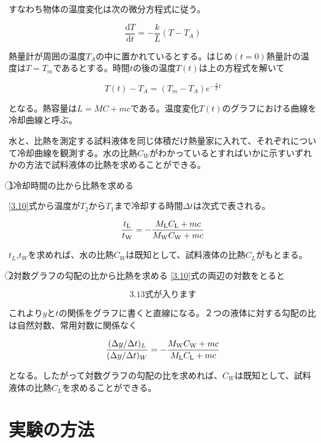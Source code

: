 \documentclass{jsarticle}
\begin{document}
すなわち物体の温度変化は次の微分方程式に従う。

\begin{equation}
	\frac{\textrm{d}T}{\textrm{d}t} = -\frac{k}{L}(T-T_A)
\end{equation}

熱量計が周囲の温度$T_A$の中に置かれているとする。はじめ$(t=0)$熱量計の温度は$T=T_m$であるとする。時間$t$の後の温度$T(t)$は上の方程式を解いて

\begin{equation}
\label{3.10}
	T(t)-T_A = (T_m-T_A)e^{-\frac{k}{L}t}
\end{equation}

となる。熱容量は$L = MC + mc$である。温度変化$T(t)$のグラフにおける曲線を冷却曲線と呼ぶ。\\
\par 水と、比熱を測定する試料液体を同じ体積だけ熱量家に入れて、それぞれについて冷却曲線を観測する。水の比熱$C_W$がわかっているとすればいかに示すいずれかの方法で試料液体の比熱を求めることができる。

\textcircled{\scriptsize 1}冷却時間の比から比熱を求める

\ref{3.10}式から温度が$T_2$から$T_1$まで冷却する時間$\Delta t$は次式で表される。

\begin{equation}
	\frac{t_\textrm L}{t_\textrm W} = -\frac{M_\textrm{L}C_\textrm L + mc}{M_\textrm W C_\textrm W +mc}
\end{equation}

$t_L$,$t_W$を求めれば、水の比熱$C_W$は既知として、試料液体の比熱$C_L$がもとまる。

\textcircled{\scriptsize 2}対数グラフの勾配の比から比熱を求める
\ref{3.10}式の両辺の対数をとると

\begin{equation}
	3.13式が入ります
\end{equation}

これより$y$と$t$の関係をグラフに書くと直線になる。２つの液体に対する勾配の比は自然対数、常用対数に関係なく

\begin{equation}
	\frac{(\Delta y/\Delta t)_L}{(\Delta y/\Delta t)_W} = -\frac{M_\textrm W C_\textrm W + mc}{M_\textrm L C_\textrm L +mc}
\end{equation}

となる。したがって対数グラフの勾配の比を求めれば、$C_W$は既知として、試料液体の比熱$C_L$を求めることができる。


\section{実験の方法}
\end{document}
